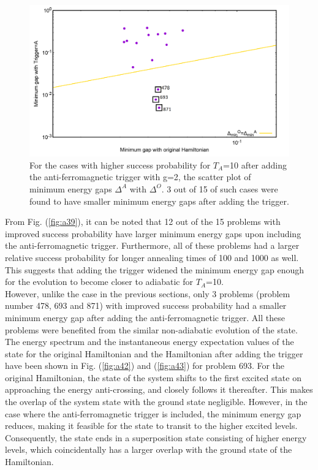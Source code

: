\documentclass[../main.tex]{subfiles}
\begin{document}
\begin{figure}[H]
\centering 
\includegraphics[scale=0.3]{selected_T10_g2.png}
\caption{For the cases with higher success probability for $T_A$=10 after adding the anti-ferromagnetic trigger with g=2, the scatter plot of minimum energy gaps $\Delta^A $ with $\Delta^O$. 3 out of 15 of such cases were found to have smaller minimum energy gaps after adding the trigger.}
\label{fig:a41}
\end{figure}

From Fig. (\ref{fig:a39}), it can be noted that 12 out of the 15 problems with improved success probability have larger minimum energy gaps upon including the anti-ferromagnetic trigger. Furthermore, all of these problems had a larger relative success probability for longer annealing times of 100 and 1000 as well. This suggests that adding the trigger widened the minimum energy gap enough for the evolution to become closer to adiabatic for $T_A$=10.\\

However, unlike the case in the previous sections, only 3 problems (problem number 478, 693 and 871) with improved success probability had a smaller minimum energy gap after adding the anti-ferromagnetic trigger. All these problems were benefited from the similar non-adiabatic evolution of the state. The energy spectrum and the instantaneous energy expectation values of the state for the original Hamiltonian and the Hamiltonian after adding the trigger have been shown in Fig. (\ref{fig:a42}) and (\ref{fig:a43}) for problem 693. For the original Hamiltonian, the state of the system shifts to the first excited state on approaching the energy anti-crossing, and closely follows it thereafter. This makes the overlap of the system state with the ground state negligible. However, in the case where the anti-ferromagnetic trigger is included, the minimum energy gap reduces, making it feasible for the state to transit to the higher excited levels. Consequently, the state ends in a superposition state consisting of higher energy levels, which coincidentally has a larger overlap with the ground state of the Hamiltonian.
\end{document}

